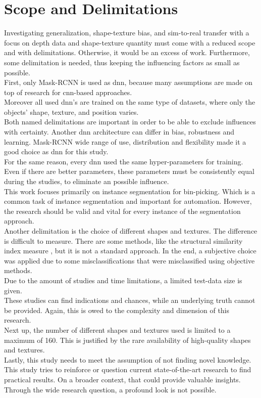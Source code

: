 	\section{Scope and Delimitations}
	\label{sec:scope-and-delimitations}
		Investigating generalization, shape-texture bias, and sim-to-real transfer with a focus on depth data and shape-texture quantity must come with a reduced scope and with delimitations. Otherwise, it would be an excess of work. Furthermore, some delimitation is needed, thus keeping the influencing factors as small as possible.\\
		First, only Mask-RCNN \cite{Kaiming2017} is used as \ac{dnn}, because many assumptions are made on top of research for \ac{cnn}-based approaches.\\
		Moreover all used \ac{dnn}'s are trained on the same type of datasets, where only the objects' shape, texture, and position varies.\\
		Both named delimitations are important in order to be able to exclude influences with certainty. Another \ac{dnn} architecture can differ in bias, robustness and learning. Mask-RCNN wide range of use, distribution and flexibility made it a good choice as \ac{dnn} for this study.\\
		For the same reason, every \ac{dnn} used the same hyper-parameters for training. Even if there are better parameters, these parameters must be consistently equal during the studies, to eliminate an possible influence.\\
		This work focuses primarily on instance segmentation for bin-picking. Which is a common task of instance segmentation and important for automation\cite{Raj2023}\cite{Danielczuk2019}\cite{Xie2021}. However, the research should be valid and vital for every instance of the segmentation approach.\\
		Another delimitation is the choice of different shapes and textures. The difference is difficult to measure. There are some methods, like the structural similarity index measure \cite{Wang2004}, but it is not a standard approach. In the end, a subjective choice was applied due to some misclassifications that were misclassified using objective methods.
		\\
		Due to the amount of studies and time limitations, a limited test-data size is given.\\
		These studies can find indications and chances, while an underlying truth cannot be provided. Again, this is owed to the complexity and dimension of this research.\\
		Next up, the number of different shapes and textures used is limited to a maximum of 160. This is justified by the rare availability of high-quality shapes and textures.\\
		Lastly, this study needs to meet the assumption of not finding novel knowledge. This study tries to reinforce or question current state-of-the-art research to find practical results. On a broader context, that could provide valuable insights. Through the wide research question, a profound look is not possible.
	
